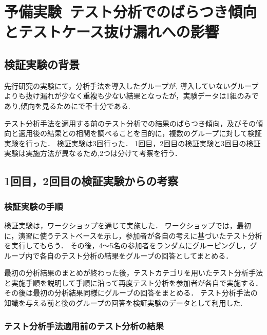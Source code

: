 \documentclass[10pt,a4j]{jarticle}
\begin{document}
\section{予備実験~テスト分析でのばらつき傾向とテストケース抜け漏れへの影響}\label{chap:3}
\subsection{検証実験の背景} \label{sec:3-1}
先行研究の実験にて，分析手法を導入したグループが, 導入していないグループよりも抜け漏れが少なく重複も少ない結果となったが，実験データは1組のみであり,傾向を見るためにで不十分である.

テスト分析手法を適用する前のテスト分析での結果のばらつき傾向，及びその傾向と適用後の結果との相関を調べることを目的に，複数のグループに対して検証実験を行った．
検証実験は3回行った．
1回目，2回目の検証実験と3回目の検証実験は実施方法が異なるため,2つは分けて考察を行う．

\subsection{1回目，2回目の検証実験からの考察}
\subsubsection{検証実験の手順}
検証実験は，ワークショップを通じて実施した．
ワークショップでは，最初に，演習に使うテストベースを示し，参加者が各自の考えに基づいたテスト分析を実行してもらう．
その後，4〜5名の参加者をランダムにグルーピングし，グループ内で各自のテスト分析の結果をグループの回答としてまとめる．

最初の分析結果のまとめが終わった後，テストカテゴリを用いたテスト分析手法と実施手順を説明して手順に沿って再度テスト分析を参加者が各自で実施する．
その後は最初の分析結果同様にグループの回答をまとめる．
テスト分析手法の知識を与える前と後のグループの回答を検証実験のデータとして利用した.

\subsubsection{テスト分析手法適用前のテスト分析の結果}
\end{document}
